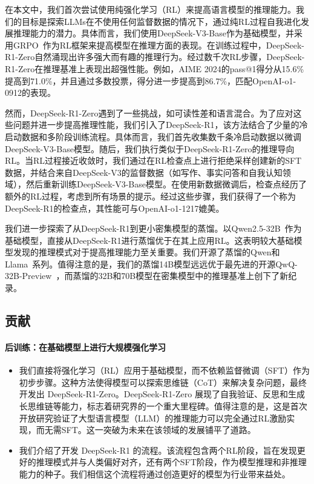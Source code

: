 \documentclass[11pt, a4paper, logo, copyright, nonumbering]{deepseek}
\newcommand{\dsri}{DeepSeek-R1}
\newcommand{\dsro}{DeepSeek-R1-Zero}
\begin{document}
在本文中，我们首次尝试使用纯强化学习（RL）来提高语言模型的推理能力。我们的目标是探索LLMs在不使用任何监督数据的情况下，通过纯RL过程自我进化发展推理能力的潜力。具体而言，我们使用DeepSeek-V3-Base作为基础模型，并采用GRPO~\citep{deepseekmath}作为RL框架来提高模型在推理方面的表现。在训练过程中，\dsro{}自然涌现出许多强大而有趣的推理行为。经过数千次RL步骤，\dsro{}在推理基准上表现出超强性能。例如，AIME 2024的pass@1得分从15.6\%提高到71.0\%，并且通过多数投票，得分进一步提高到86.7\%，匹配OpenAI-o1-0912的表现。

然而，\dsro{}遇到了一些挑战，如可读性差和语言混合。为了应对这些问题并进一步提高推理性能，我们引入了\dsri{}，该方法结合了少量的冷启动数据和多阶段训练流程。具体而言，我们首先收集数千条冷启动数据以微调DeepSeek-V3-Base模型。随后，我们执行类似于\dsro{}的推理导向RL。当RL过程接近收敛时，我们通过在RL检查点上进行拒绝采样创建新的SFT数据，并结合来自DeepSeek-V3的监督数据（如写作、事实问答和自我认知领域），然后重新训练DeepSeek-V3-Base模型。在使用新数据微调后，检查点经历了额外的RL过程，考虑到所有场景的提示。经过这些步骤，我们获得了一个称为\dsri{}的检查点，其性能可与OpenAI-o1-1217媲美。

我们进一步探索了从\dsri{}到更小密集模型的蒸馏。以Qwen2.5-32B~\citep{qwen2_5}作为基础模型，直接从\dsri{}进行蒸馏优于在其上应用RL。这表明较大基础模型发现的推理模式对于提高推理能力至关重要。我们开源了蒸馏的Qwen和Llama~\citep{llama3}系列。值得注意的是，我们的蒸馏14B模型远远优于最先进的开源QwQ-32B-Preview~\citep{QwQ}，而蒸馏的32B和70B模型在密集模型中的推理基准上创下了新纪录。
\subsection{贡献}

\paragraph{后训练：在基础模型上进行大规模强化学习}
\begin{itemize}[topsep=0pt]
    \item
    我们直接将强化学习（RL）应用于基础模型，而不依赖监督微调（SFT）作为初步步骤。这种方法使得模型可以探索思维链（CoT）来解决复杂问题，最终开发出 \dsro{}。\dsro{} 展现了自我验证、反思和生成长思维链等能力，标志着研究界的一个重大里程碑。值得注意的是，这是首次开放研究验证了大型语言模型（LLM）的推理能力可以完全通过RL激励实现，而无需SFT。这一突破为未来在该领域的发展铺平了道路。
    \item
    我们介绍了开发 \dsri{} 的流程。该流程包含两个RL阶段，旨在发现更好的推理模式并与人类偏好对齐，还有两个SFT阶段，作为模型推理和非推理能力的种子。我们相信这个流程将通过创造更好的模型为行业带来益处。

\end{itemize}
\end{document}
